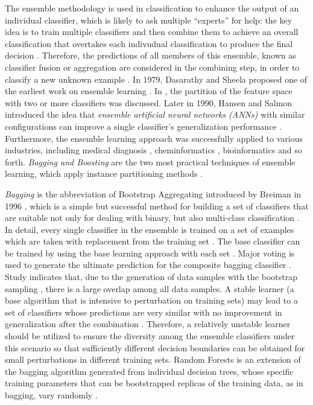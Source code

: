 The ensemble methodology is used in classification to enhance the output of an individual classifier, which is likely to ask multiple ``experts'' for help: the key idea is to train multiple classifiers and then combine them to achieve an overall classification that overtakes each indivudual classification to produce the final decision \cite{26}. Therefore, the predictions of all members of this ensemble, known as classifier fusion or aggregation are considered in the combining step, in order to classify a new unknown example \cite{10}. In 1979, Dasarathy and Sheela proposed one of the earliest work on ensemble learning \cite{30}. In \cite{30}, the partition of the feature space with two or more classifiers was discussed. Later in 1990, Hansen and Salmon introduced the idea that \textit{ensemble artificial neural networks (ANNs)} with similar configurations can improve a single classifier's generalization performance \cite{31}. Furthermore, the ensemble learning approach was successfully applied to various industries, including medical diagnosis \cite{27}, cheminformatics \cite{28}, bioinformatics \cite{29} and so forth. \textit{Bagging and Boosting} are the two most practical techniques of ensemble learning, which apply instance partitioning methods \cite{36}.

\textit{Bagging} is the abbreviation of Bootstrap Aggregating introduced by Breiman in 1996 \cite{37}, which is a simple but successful method for building a set of classifiers that are suitable not only for dealing with binary, but also multi-class classification \cite{26,33}. In detail, every single classifier in the ensemble is trained on a set of examples which are taken with replacement from the training set \cite{26,33,37}. The base classifier can be trained by using the base learning approach with each set \cite{33}. Major voting is used to generate the ultimate prediction for the composite bagging classifier \cite{26}. Study \cite{33} indicates that, due to the generation of data samples with the bootstrap sampling \cite{37}, there is a large overlap among all data samples. A stable learner (a base algorithm that is intensive to perturbation on training sets) may lead to a set of classifiers whose predictions are very similar with no improvement in generalization after the combination \cite{26,33}. Therefore, a relatively unstable learner should be utilized to ensure the diversity among the ensemble classifiers under this scenario so that sufficiently different decision boundaries can be obtained for small perturbations in different training sets. Random Forests \cite{39} is an extension of the bagging algorithm generated from individual decision trees, whose specific training parameters that can be bootstrapped replicas of the training data, as in bagging, vary randomly \cite{38}.

